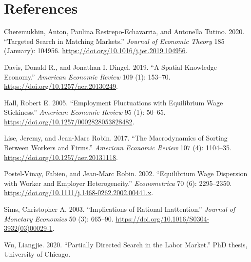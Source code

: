 \documentclass[
  letterpaper,
  DIV=11,
  numbers=noendperiod]{scrreprt}
\newlength{\cslhangindent}
\newlength{\cslentryspacingunit} %
\newenvironment{CSLReferences}[2] %
 {%
  \setlength{\parindent}{0pt}
  \ifodd #1
  \let\oldpar\par
  \def\par{\hangindent=\cslhangindent\oldpar}
  \fi
  \setlength{\parskip}{#2\cslentryspacingunit}
 }%
 {}
\begin{document}
\hypertarget{bibliography}{%
\chapter*{References}\label{bibliography}}

\hypertarget{refs}{}
\begin{CSLReferences}{1}{0}
\leavevmode{}%
Cheremukhin, Anton, Paulina Restrepo-Echavarria, and Antonella Tutino.
2020. {``Targeted Search in Matching Markets.''} \emph{Journal of
Economic Theory} 185 (January): 104956.
\url{https://doi.org/10.1016/j.jet.2019.104956}.

\leavevmode{}%
Davis, Donald R., and Jonathan I. Dingel. 2019. {``A {Spatial Knowledge
Economy}.''} \emph{American Economic Review} 109 (1): 153--70.
\url{https://doi.org/10.1257/aer.20130249}.

\leavevmode{}%
Hall, Robert E. 2005. {``Employment {Fluctuations} with {Equilibrium
Wage Stickiness}.''} \emph{American Economic Review} 95 (1): 50--65.
\url{https://doi.org/10.1257/0002828053828482}.

\leavevmode{}%
Lise, Jeremy, and Jean-Marc Robin. 2017. {``The {Macrodynamics} of
{Sorting} Between {Workers} and {Firms}.''} \emph{American Economic
Review} 107 (4): 1104--35. \url{https://doi.org/10.1257/aer.20131118}.

\leavevmode{}%
Postel-Vinay, Fabien, and Jean-Marc Robin. 2002. {``Equilibrium {Wage
Dispersion} with {Worker} and {Employer Heterogeneity}.''}
\emph{Econometrica} 70 (6): 2295--2350.
\url{https://doi.org/10.1111/j.1468-0262.2002.00441.x}.

\leavevmode{}%
Sims, Christopher A. 2003. {``Implications of Rational Inattention.''}
\emph{Journal of Monetary Economics} 50 (3): 665--90.
\url{https://doi.org/10.1016/S0304-3932(03)00029-1}.

\leavevmode{}%
Wu, Liangjie. 2020. {``Partially {Directed Search} in the {Labor
Market}.''} PhD thesis, University of Chicago.

\end{CSLReferences}
\end{document}
